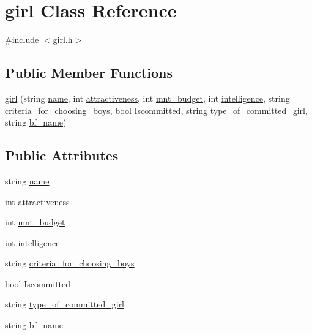 \hypertarget{classgirl}{}\section{girl Class Reference}
\label{classgirl}


{\ttfamily \#include $<$girl.\+h$>$}

\subsection*{Public Member Functions}
\begin{DoxyCompactItemize}
\item 
\hyperlink{classgirl_a515ef3f56aaa368ff430235e10b805c4}{girl} (string \hyperlink{classgirl_a29a828b5fa3408535974cde15ccdd75b}{name}, int \hyperlink{classgirl_a0ba667f73d41f7bc3236141daaec9246}{attractiveness}, int \hyperlink{classgirl_ab37511df32db77f4c7307311daa32b24}{mnt\+\_\+budget}, int \hyperlink{classgirl_a6c7e5b42204c88fae8b91aae92ae17f1}{intelligence}, string \hyperlink{classgirl_a9ba2affef7bf8c54fc3ca7c0e16a1f1b}{criteria\+\_\+for\+\_\+choosing\+\_\+boys}, bool \hyperlink{classgirl_a2e6c34b60f514827eb9809e015888ee3}{Iscommitted}, string \hyperlink{classgirl_ae45fc5adc5b383a61a4f5728ac434174}{type\+\_\+of\+\_\+committed\+\_\+girl}, string \hyperlink{classgirl_a2de471a846b3cb724daef9b70e6614f7}{bf\+\_\+name})
\end{DoxyCompactItemize}
\subsection*{Public Attributes}
\begin{DoxyCompactItemize}
\item 
string \hyperlink{classgirl_a29a828b5fa3408535974cde15ccdd75b}{name}
\item 
int \hyperlink{classgirl_a0ba667f73d41f7bc3236141daaec9246}{attractiveness}
\item 
int \hyperlink{classgirl_ab37511df32db77f4c7307311daa32b24}{mnt\+\_\+budget}
\item 
int \hyperlink{classgirl_a6c7e5b42204c88fae8b91aae92ae17f1}{intelligence}
\item 
string \hyperlink{classgirl_a9ba2affef7bf8c54fc3ca7c0e16a1f1b}{criteria\+\_\+for\+\_\+choosing\+\_\+boys}
\item 
bool \hyperlink{classgirl_a2e6c34b60f514827eb9809e015888ee3}{Iscommitted}
\item 
string \hyperlink{classgirl_ae45fc5adc5b383a61a4f5728ac434174}{type\+\_\+of\+\_\+committed\+\_\+girl}
\item 
string \hyperlink{classgirl_a2de471a846b3cb724daef9b70e6614f7}{bf\+\_\+name}
\end{DoxyCompactItemize}


